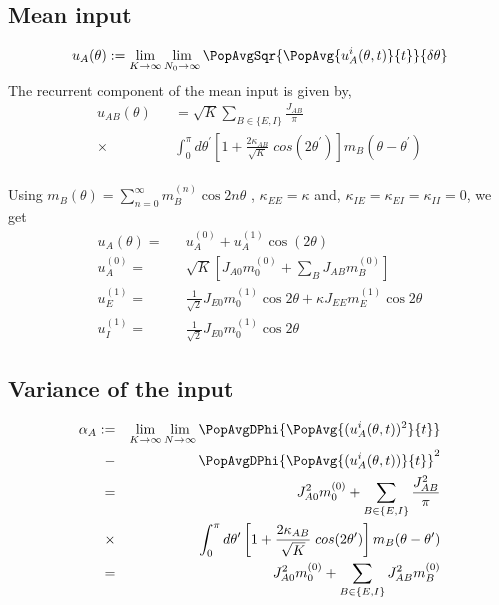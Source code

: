 \subsection{Mean input}

\begin{eqnarray}
u_A(\theta) := \lim_{K \rightarrow \infty} \lim_{N_0 \rightarrow \infty} \PopAvgSqr{\PopAvg{u_A^i(\theta, t)}{t}}{\delta \theta} 
\end{eqnarray}
The recurrent component of the mean input is given by, 
\begin{eqnarray}
u_{AB}(\theta)&& = \sqrt{K} \sum_{B \in \lbrace E, I  \rbrace} \frac{J_{AB}}{\pi} \nonumber \\
\times&&\int_0^{\pi} d\theta^{\prime} \left[ 1 +  \frac{2\kappa_{AB}}{\sqrt{K}} \; cos(2 \theta^{\prime}) \right] m_B(\theta - \theta^{\prime})
\end{eqnarray} \\
Using $m_B(\theta) = \sum_{n = 0}^{\infty} m_B^{(n)} \cos 2 n \theta$ , $\kappa_{EE} = \kappa$ and, $\kappa_{IE} = \kappa_{EI} = \kappa_{II} = 0$, we get
\begin{eqnarray}
u_A(\theta) =&& u_A^{(0)} + u_A^{(1)} \cos(2 \theta) \\ 
u_A^{(0)} =&& \sqrt{K} \left[J_{A0} m_0^{(0)} + \sum_B J_{AB} m_B^{(0)} \right] \label{ue0equation} \\
u_E^{(1)} =&& \frac{1}{\sqrt{2}} J_{E0} m_0^{(1)} \cos 2 \theta + \kappa J_{EE} m_E^{(1)} \cos 2 \theta \label{ue1} \\
u_I^{(1)} =&& \frac{1}{\sqrt{2}} J_{E0} m_0^{(1)} \cos 2 \theta  \label{ui1}
\end{eqnarray}

\subsection{Variance of the input}
\begin{eqnarray}
\alpha_A :=&& \lim_{K \rightarrow \infty} \lim_{N \rightarrow \infty}
\PopAvgDPhi{\PopAvg{(u_A^i(\theta, t))^2}{t}} \nonumber \\ 
-&& \PopAvgDPhi{\PopAvg{(u_A^i(\theta, t))}{t}}^2  \\
=&& J_{A0}^2 m_0^{(0)} + \sum_{B \in \lbrace  E, I \rbrace } \frac{J_{AB}^2}{\pi} \nonumber \\
\times&&\int_0^{\pi} d\theta^{\prime} \left[ 1 +  \frac{2\kappa_{AB}}{\sqrt{K}} \; cos(2 \theta^{\prime}) \right] m_B(\theta - \theta^{\prime}) \\
=&& J_{A0}^2 m_0^{(0)} + \sum_{B \in \lbrace  E, I \rbrace } J_{AB}^2 m_B^{(0)} \label{alphaE}
\end{eqnarray}

